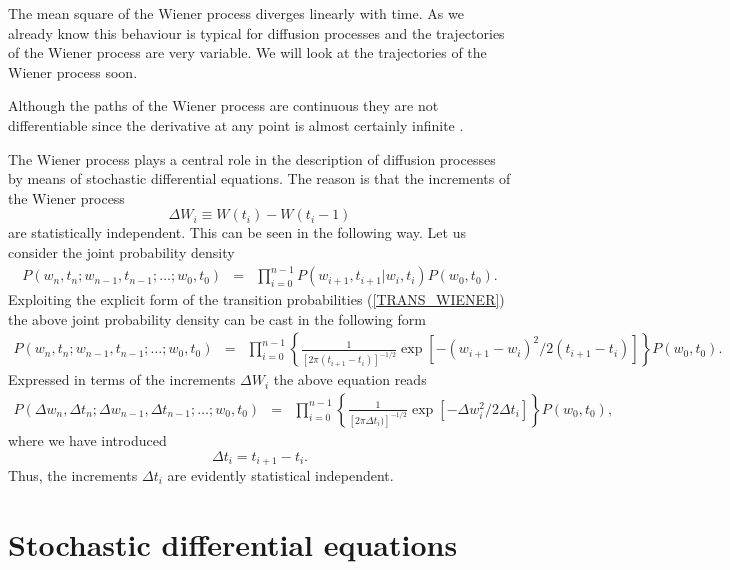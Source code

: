 The mean square of the Wiener process diverges linearly with time.
As we already know this behaviour is typical for diffusion 
processes and the trajectories of the Wiener process are very 
variable. We will look at the trajectories of the Wiener process 
soon. 

Although the paths of the Wiener process are continuous they are 
not differentiable since the derivative at any point is 
almost certainly infinite \cite{GARDINER}.

The Wiener process plays a central role in the description of 
diffusion processes by means of stochastic differential equations.
The reason is that the increments of the Wiener process
\begin{equation*}
\Delta W_i \equiv W(t_i) - W(t_i-1)
\end{equation*}
are statistically independent. This can be seen in the following 
way. Let us consider the joint probability density
\begin{eqnarray*}
P(w_n,t_n; w_{n-1},t_{n-1}; \ldots ; w_0,t_0) &=&
\prod_{i=0}^{n-1} P(w_{i+1},t_{i+1}|w_i,t_i) P(w_0,t_0).
\end{eqnarray*}
Exploiting the explicit form of the transition probabilities
(\ref{TRANS_WIENER}) the above joint probability density can be 
cast in the following form
\begin{eqnarray*}
P(w_n,t_n; w_{n-1},t_{n-1}; \ldots ; w_0,t_0) &=&
\prod_{i=0}^{n-1} 
\left\{ \frac{1}{[2 \pi (t_{i+1}-t_i)]^{-1/2}}
\exp[-(w_{i+1}-w_i)^2/2(t_{i+1}-t_i)]
\right\}
P(w_0,t_0).
\end{eqnarray*}
Expressed in terms of the increments $\Delta W_i$ the above 
equation reads
\begin{eqnarray*}
P(\Delta w_n,\Delta t_n; \Delta w_{n-1},\Delta t_{n-1}; \ldots ; w_0,t_0) &=&
\prod_{i=0}^{n-1} 
\left\{ \frac{1}{[2 \pi \Delta t_i)]^{-1/2}}
\exp[-\Delta w_i^2/2 \Delta t_i]
\right\}
P(w_0,t_0),
\end{eqnarray*}
where we have introduced
\begin{equation*}
\Delta t_i = t_{i+1} - t_i.
\end{equation*}
Thus, the increments $\Delta t_i$ are evidently statistical 
independent.

\section{Stochastic differential equations}

